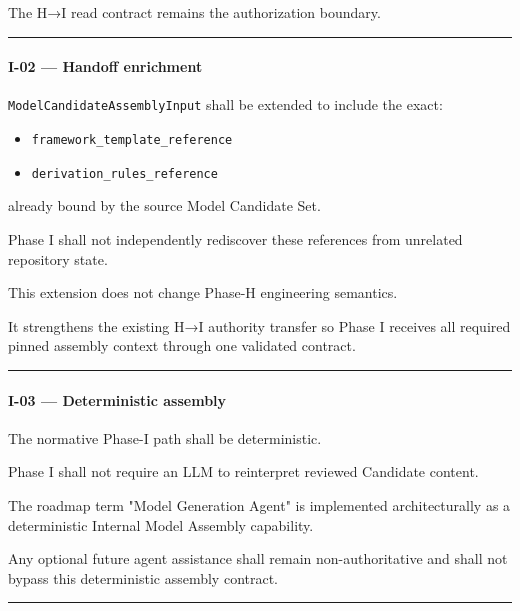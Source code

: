 The H→I read contract remains the authorization boundary.

\begin{center}\rule{0.5\linewidth}{0.5pt}\end{center}

\hypertarget{i-02--handoff-enrichment}{%
\paragraph{I-02 --- Handoff enrichment}\label{i-02--handoff-enrichment}}

\texttt{ModelCandidateAssemblyInput} shall be extended to include the exact:

\begin{itemize}
\tightlist
\item
  \texttt{framework\_template\_reference}
\item
  \texttt{derivation\_rules\_reference}
\end{itemize}

already bound by the source Model Candidate Set.

Phase I shall not independently rediscover these references from unrelated repository state.

This extension does not change Phase-H engineering semantics.

It strengthens the existing H→I authority transfer so Phase I receives all required pinned assembly context through one validated contract.

\begin{center}\rule{0.5\linewidth}{0.5pt}\end{center}

\hypertarget{i-03--deterministic-assembly}{%
\paragraph{I-03 --- Deterministic assembly}\label{i-03--deterministic-assembly}}

The normative Phase-I path shall be deterministic.

Phase I shall not require an LLM to reinterpret reviewed Candidate content.

The roadmap term "Model Generation Agent" is implemented architecturally as a deterministic Internal Model Assembly capability.

Any optional future agent assistance shall remain non-authoritative and shall not bypass this deterministic assembly contract.

\begin{center}\rule{0.5\linewidth}{0.5pt}\end{center}


